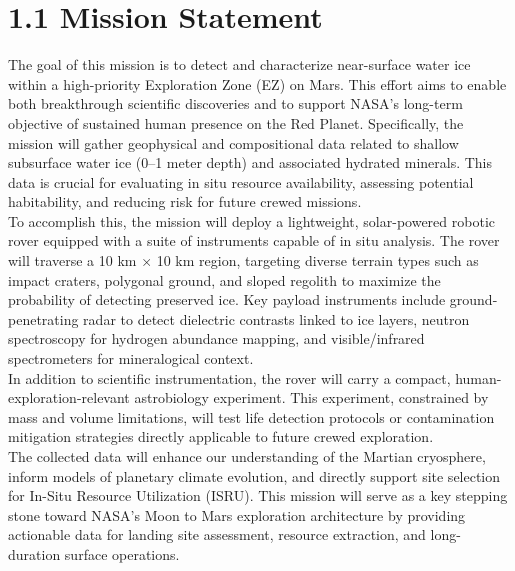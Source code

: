 \section*{1.1 Mission Statement}

The goal of this mission is to detect and characterize near-surface water ice within a high-priority Exploration Zone (EZ) on Mars. This effort aims to enable both breakthrough scientific discoveries and to support NASA's long-term objective of sustained human presence on the Red Planet. Specifically, the mission will gather geophysical and compositional data related to shallow subsurface water ice (0–1 meter depth) and associated hydrated minerals. This data is crucial for evaluating in situ resource availability, assessing potential habitability, and reducing risk for future crewed missions. \\

To accomplish this, the mission will deploy a lightweight, solar-powered robotic rover equipped with a suite of instruments capable of in situ analysis. The rover will traverse a 10 km × 10 km region, targeting diverse terrain types such as impact craters, polygonal ground, and sloped regolith to maximize the probability of detecting preserved ice. Key payload instruments include ground-penetrating radar to detect dielectric contrasts linked to ice layers, neutron spectroscopy for hydrogen abundance mapping, and visible/infrared spectrometers for mineralogical context. \\

In addition to scientific instrumentation, the rover will carry a compact, human-exploration-relevant astrobiology experiment. This experiment, constrained by mass and volume limitations, will test life detection protocols or contamination mitigation strategies directly applicable to future crewed exploration. \\

The collected data will enhance our understanding of the Martian cryosphere, inform models of planetary climate evolution, and directly support site selection for In-Situ Resource Utilization (ISRU). This mission will serve as a key stepping stone toward NASA’s Moon to Mars exploration architecture by providing actionable data for landing site assessment, resource extraction, and long-duration surface operations. \\